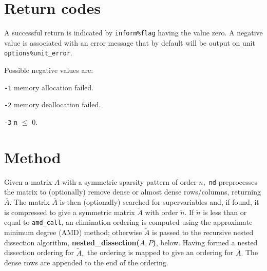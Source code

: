 
\section{Return codes} \label{nd:errors}

A successful return is indicated by
{\tt inform\%flag} having the value zero.
A negative value is associated with an error message that by default will
be output on unit {\tt options\%unit\_error}.

Possible negative values are:

\begin{description}

\item{} {\tt -1} memory allocation failed.
\item{} {\tt -2} memory deallocation failed.
\item{} {\tt -3} {\tt n} $\le$ 0.
\end{description}


\section{Method} \label{nd:method}

Given a matrix $A$ with a symmetric sparsity pattern of order $n,$ {\tt nd} preprocesses 
the matrix to (optionally) remove dense or almost dense rows/columns, returning 
$\overline{A}.$ The matrix $\overline{A}$ is then (optionally) searched for 
supervariables and, if found, it is compressed to give a symmetric matrix 
$\widetilde{A}$ with order $\tilde{n}.$ If $\tilde{n}$ is less than or equal to 
{\tt amd\_call}, an elimination ordering is computed using the 
approximate minimum degree (AMD) method; otherwise $\widetilde{A}$ is passed to the 
recursive nested dissection algorithm, \textbf{nested\_dissection($A,P$)}, below. Having formed a 
nested dissection ordering for $\widetilde{A},$ the 
ordering is mapped to give an ordering for $\overline{A}.$ The dense rows are 
appended to the end of the ordering. 

